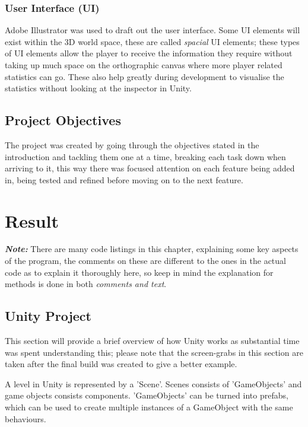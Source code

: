 \documentclass[11pt]{report}
\begin{document}
\subsection{User Interface (UI)}
Adobe Illustrator was used to draft out the user interface. Some UI elements will exist within the 3D world space, these are called \textit{spacial} UI elements; these types of UI elements allow the player to receive the information they require without taking up much space on the orthographic canvas where more player related statistics can go\cite{UIChoices}. These also help greatly during development to visualise the statistics without looking at the inspector in Unity.

\section{Project Objectives}
The project was created by going through the objectives stated in the introduction and tackling them one at a time, breaking each task down when arriving to it, this way there was focused attention on each feature being added in, being tested and refined before moving on to the next feature.

\chapter{Result}

\textit{\textbf{Note:}} There are many code listings in this chapter, explaining some key aspects of the program, the comments on these are different to the ones in the actual code as to explain it thoroughly here, so keep in mind the explanation for methods is done in both \textit{comments and text}.

\section{Unity Project}

This section will provide a brief overview of how Unity works as substantial time was spent understanding this; please note that the screen-grabs in this section are taken after the final build was created to give a better example.

A level in Unity is represented by a 'Scene'. Scenes consists of 'GameObjects' and game objects consists components. 'GameObjects' can be turned into prefabs, which can be used to create multiple instances of a GameObject with the same behaviours.
\end{document}
